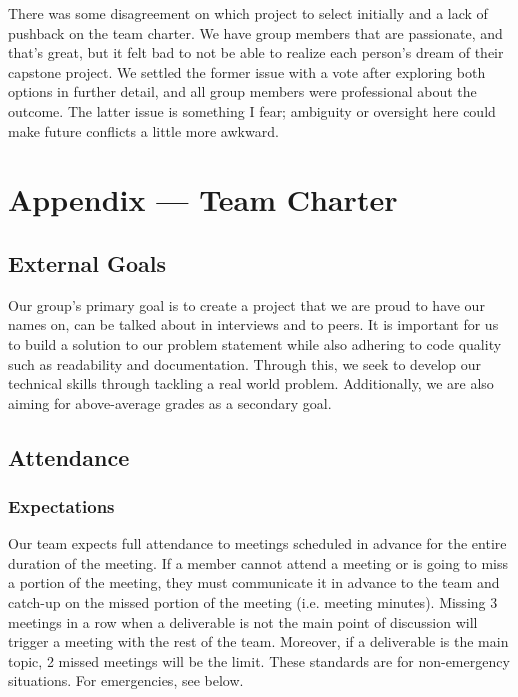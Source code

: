 \documentclass{article}
\begin{document}
There was some disagreement on which project to select initially and a lack of pushback on the team charter. We have group members that are passionate, and that’s great, but it felt bad to not be able to realize each person’s dream of their capstone project. We settled the former issue with a vote after exploring both options in further detail, and all group members were professional about the outcome. The latter issue is something I fear; ambiguity or oversight here could make future conflicts a little more awkward.

\newpage{}

\section*{Appendix --- Team Charter}


\subsection*{External Goals}

Our group's primary goal is to create a project that we are proud to have our names
on, can be talked about in interviews and to peers. It is important for us to build 
a solution to our problem statement while also adhering to code quality such as 
readability and documentation. Through this, we seek to develop our technical skills 
through tackling a real world problem. Additionally, we are also aiming for above-average 
grades as a secondary goal. 

\subsection*{Attendance}

\subsubsection*{Expectations}

Our team expects full attendance to meetings scheduled in advance for the entire duration 
of the meeting. If a member cannot attend a meeting or is going to miss a portion of the meeting, 
they must communicate it in advance to the team and catch-up on the missed portion of the meeting 
(i.e. meeting minutes). Missing 3 meetings in a row when a deliverable is not the main point of 
discussion will trigger a meeting with the rest of the team. Moreover, if a deliverable is the 
main topic, 2 missed meetings will be the limit. These standards are for non-emergency situations. 
For emergencies, see below. 
\end{document}
